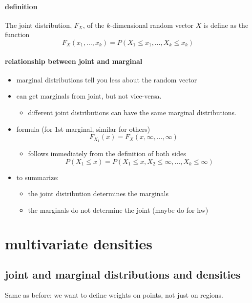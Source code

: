 \paragraph{definition}
\label{sec-1-2-1}

      The joint distribution, $F_X$, of the $k$-dimensional random
      vector $X$ is define as the function 
      \[ F_X(x_1,\dots,x_k) = P(X_1 \leq x_1,\dots,X_k \leq x_k) \]
\paragraph{relationship between joint and marginal}
\label{sec-1-2-2}

\begin{itemize}
\item marginal distributions tell you less about the random vector
\item can get marginals from joint, but not vice-versa.
\begin{itemize}
\item different joint distributions can have the same marginal
          distributions.
\end{itemize}
\item formula (for 1st marginal, similar for others)
        \[ F_{X_1}(x) = F_X(x, \infty, \dots,\infty) \]
\begin{itemize}
\item follows immediately from the definition of both sides
          \[ P(X_1 \leq x) = P(X_1 \leq x, X_2 \leq \infty, \dots, X_k
          \leq \infty) \]
\end{itemize}
\item to summarize:
\begin{itemize}
\item the joint distribution determines the marginals
\item the marginals do not determine the joint (maybe do for hw)
\end{itemize}
\end{itemize}
\section{multivariate densities}
\label{sec-2}
\subsection{joint and marginal distributions and densities}
\label{sec-2-1}

      Same as before: we want to define weights on points, not just on
      regions.

